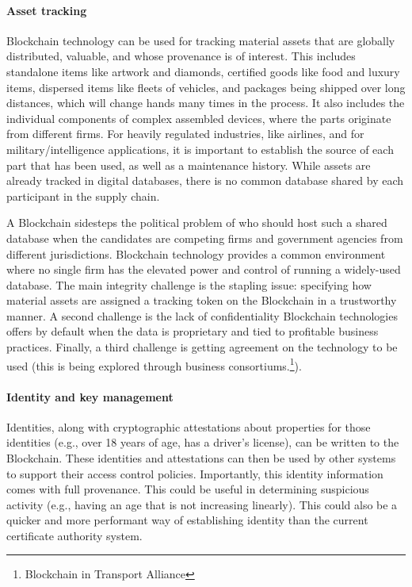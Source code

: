 \paragraph{Asset tracking} 

Blockchain technology can be used for tracking material assets that are globally distributed, valuable, and whose provenance is of interest.
This includes standalone items like artwork and diamonds, certified goods like food and luxury items, dispersed items like fleets of vehicles, and packages being shipped over long distances, which will change hands many times in the process. 
It also includes the individual components of complex assembled devices, where the parts originate from different firms. 
For heavily regulated industries, like airlines, and for military/intelligence applications, it is important to establish the source of each part that has been used, as well as a maintenance history.
While assets are already tracked in digital databases, there is no common database shared by each participant in the supply chain.  

A Blockchain sidesteps the political problem of who should host such a shared database when the candidates are competing firms and government agencies from different jurisdictions. 
Blockchain technology provides a common environment where no single firm has the elevated power and control of running a widely-used database. 
The main integrity challenge is the stapling issue: specifying how material assets are assigned a tracking token on the Blockchain in a trustworthy manner. 
A second challenge is the lack of confidentiality Blockchain technologies offers by default when the data is proprietary and tied to profitable business practices.
Finally, a third challenge is getting agreement on the technology to be used (this is being explored through business consortiums.\footnote{\eg Blockchain in Transport Alliance}).

\paragraph{Identity and key management}

Identities, along with cryptographic attestations about properties for those identities (e.g., over 18 years of age, has a driver's license), can be written to the Blockchain.
These identities and attestations can then be used by other systems to support their access control policies.
Importantly, this identity information comes with full provenance. This could be useful in determining suspicious activity (e.g., having an age that is not increasing linearly).
This could also be a quicker and more performant way of establishing identity than the current certificate authority system.

